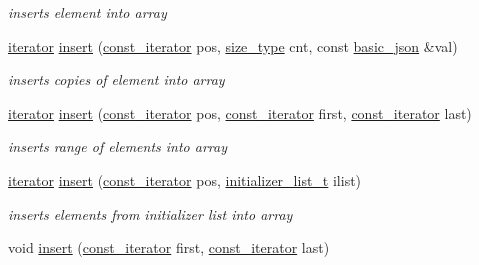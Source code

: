 \begin{DoxyCompactItemize}
\begin{DoxyCompactList}\small\item\em inserts element into array \end{DoxyCompactList}\item 
\hyperlink{classnlohmann_1_1basic__json_aa549b2b382916b3baafb526e5cb410bd}{iterator} \hyperlink{classnlohmann_1_1basic__json_a71e197e6cc78c3960011f68a75f8ef22}{insert} (\hyperlink{classnlohmann_1_1basic__json_aebd2cfa7e4ded4e97cde9269bfeeea38}{const\+\_\+iterator} pos, \hyperlink{classnlohmann_1_1basic__json_a3ada29bca70b4965f6fd37ec1c8f85f7}{size\+\_\+type} cnt, const \hyperlink{classnlohmann_1_1basic__json}{basic\+\_\+json} \&val)
\begin{DoxyCompactList}\small\item\em inserts copies of element into array \end{DoxyCompactList}\item 
\hyperlink{classnlohmann_1_1basic__json_aa549b2b382916b3baafb526e5cb410bd}{iterator} \hyperlink{classnlohmann_1_1basic__json_a8137d5471edcd71606e42155ed9c23e2}{insert} (\hyperlink{classnlohmann_1_1basic__json_aebd2cfa7e4ded4e97cde9269bfeeea38}{const\+\_\+iterator} pos, \hyperlink{classnlohmann_1_1basic__json_aebd2cfa7e4ded4e97cde9269bfeeea38}{const\+\_\+iterator} first, \hyperlink{classnlohmann_1_1basic__json_aebd2cfa7e4ded4e97cde9269bfeeea38}{const\+\_\+iterator} last)
\begin{DoxyCompactList}\small\item\em inserts range of elements into array \end{DoxyCompactList}\item 
\hyperlink{classnlohmann_1_1basic__json_aa549b2b382916b3baafb526e5cb410bd}{iterator} \hyperlink{classnlohmann_1_1basic__json_a856b8764efd21dac4205a00fec82e09a}{insert} (\hyperlink{classnlohmann_1_1basic__json_aebd2cfa7e4ded4e97cde9269bfeeea38}{const\+\_\+iterator} pos, \hyperlink{classnlohmann_1_1basic__json_ac569f292a070dfd2f6b69c16e746095a}{initializer\+\_\+list\+\_\+t} ilist)
\begin{DoxyCompactList}\small\item\em inserts elements from initializer list into array \end{DoxyCompactList}\item 
void \hyperlink{classnlohmann_1_1basic__json_a0181d03c6314bedcbad2e92d3676223c}{insert} (\hyperlink{classnlohmann_1_1basic__json_aebd2cfa7e4ded4e97cde9269bfeeea38}{const\+\_\+iterator} first, \hyperlink{classnlohmann_1_1basic__json_aebd2cfa7e4ded4e97cde9269bfeeea38}{const\+\_\+iterator} last)

\end{DoxyCompactItemize}
